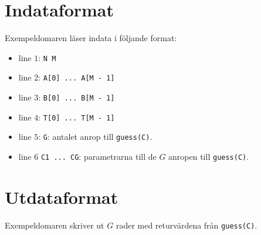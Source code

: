 \section*{Indataformat}
Exempeldomaren läser indata i följande format:

\begin{itemize}
  \item line $1$: \texttt{N M}
  \item line $2$: \texttt{A[0] ... A[M - 1]}
  \item line $3$: \texttt{B[0] ... B[M - 1]}
  \item line $4$: \texttt{T[0] ... T[M - 1]}
  \item line $5$: \texttt{G}: antalet anrop till \texttt{guess(C)}.
  \item line $6$ \texttt{C1 ... CG}: parametrarna till de $G$ anropen till \texttt{guess(C)}.
\end{itemize}

\section*{Utdataformat}
Exempeldomaren skriver ut $G$ rader med returvärdena från \texttt{guess(C)}.
